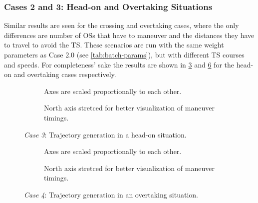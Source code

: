 \subsubsection{Cases 2 and 3: Head-on and Overtaking Situations}
Similar results are seen for the crossing and overtaking cases, where the only differences are number of OSs that have to maneuver and the distances they have to travel to avoid the TS. These scenarios are run with the same weight parameters as Case 2.0 (see \cref{tab:batch-params}), but with different TS courses and speeds. For completeness' sake the results are shown in \cref{fig:head-on} and \cref{fig:overtaking} for the head-on and overtaking cases respectively. 



\begin{figure}[htbp]
    \centering
    \begin{subfigure}[b]{\textwidth}
        \centering
        
        \caption{Axes are scaled proportionally to each other.}
        \label{fig:head-on-scenario-a}
    \end{subfigure}
    \begin{subfigure}[b]{\textwidth}
        \centering
        
        \caption{North axis stretced for better visualization of maneuver timings.}
        \label{fig:head-on-scenario-b}
    \end{subfigure}
    \caption{\emph{Case 3}: Trajectory generation in a head-on situation.}
    \label{fig:head-on}
\end{figure}




\begin{figure}[htbp]
    \centering
    \begin{subfigure}[b]{\textwidth}
        
        \caption{Axes are scaled proportionally to each other.}
        \label{fig:overtaking-scenario-a}
    \end{subfigure}
    \begin{subfigure}[b]{\textwidth}
        
        \caption{North axis stretced for better visualization of maneuver timings.}
        \label{fig:overtaking-scenario-b}
    \end{subfigure}
    \caption{\emph{Case 4}: Trajectory generation in an overtaking situation.}
    \label{fig:overtaking}
\end{figure}




